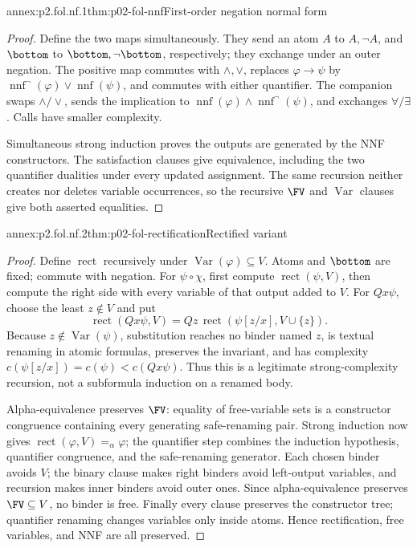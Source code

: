 
\begin{annexitem}{annex:p2.fol.nf.1}{thm:p02-fol-nnf}{First-order negation normal form}
\begin{proof}
Define the two maps simultaneously.  They send an atom \(A\) to
\(A,\neg A\), and \(\bottom\) to \(\bottom,\neg\bottom\), respectively;
they exchange under an outer negation.  The positive map commutes with
\(\land,\lor\), replaces \(\varphi\to\psi\) by
\(\operatorname{nnf}^{\neg}(\varphi)\lor\operatorname{nnf}(\psi)\), and
commutes with either quantifier.  The companion swaps \(\land/\lor\), sends
the implication to
\(\operatorname{nnf}(\varphi)\land\operatorname{nnf}^{\neg}(\psi)\), and
exchanges \(\forall/\exists\).  Calls have smaller complexity.

Simultaneous strong induction proves the outputs are generated by the NNF
constructors.  The satisfaction clauses give equivalence, including the two
quantifier dualities under every updated assignment.  The same recursion
neither creates nor deletes variable occurrences, so the recursive
\(\FV\) and \(\operatorname{Var}\) clauses give both asserted equalities.
\end{proof}
\end{annexitem}

\begin{annexitem}{annex:p2.fol.nf.2}{thm:p02-fol-rectification}{Rectified variant}
\begin{proof}
Define \(\operatorname{rect}\) recursively under
\(\operatorname{Var}(\varphi)\subseteq V\).  Atoms and \(\bottom\) are
fixed; commute with negation.  For
\(\psi\circ\chi\), first compute \(\operatorname{rect}(\psi,V)\), then compute the
right side with every variable of that output added to \(V\).  For
\(Qx\psi\), choose the least \(z\notin V\) and put
\[
 \operatorname{rect}(Qx\psi,V)
 =Qz\,\operatorname{rect}(\psi[z/x],V\cup\{z\}).
\]
Because \(z\notin\operatorname{Var}(\psi)\), substitution reaches no
binder named \(z\), is textual renaming in atomic formulas, preserves the
invariant, and has complexity
\(c(\psi[z/x])=c(\psi)<c(Qx\psi)\).  Thus this is a legitimate
strong-complexity recursion, not a subformula induction on a renamed body.

Alpha-equivalence preserves \(\FV\): equality of free-variable sets is a
constructor congruence containing every generating safe-renaming pair.
Strong induction now gives
\(\operatorname{rect}(\varphi,V)=_{\alpha}\varphi\); the quantifier step combines the
induction hypothesis, quantifier congruence, and the safe-renaming generator.
Each chosen binder avoids \(V\); the binary clause makes right binders avoid
left-output variables, and recursion makes inner binders avoid outer ones.
Since alpha-equivalence preserves \(\FV\subseteq V\), no binder is free.
Finally every clause preserves the constructor tree; quantifier renaming
changes variables only inside atoms.  Hence rectification, free variables,
and NNF are all preserved.
\end{proof}
\end{annexitem}

